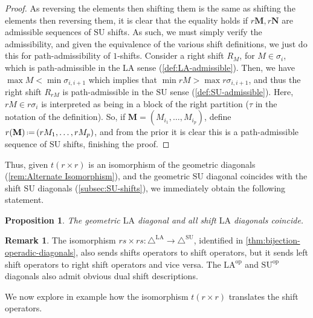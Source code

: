 \documentclass{amsart}
\newtheorem{proposition}[theorem]{Proposition}
\theoremstyle{definition}
\newtheorem{remark}[theorem]{Remark}
\newcommand{\eqdef}{\mbox{\,\raisebox{0.2ex}{\scriptsize\ensuremath{\mathrm:}}\ensuremath{=}\,}} %
\newcommand{\SU}{\mathrm{SU}}
\newcommand{\LA}{\mathrm{LA}}
\newcommand{\SUD}{\triangle^{\mathrm{SU}}}
\newcommand{\LAD}{\triangle^{\mathrm{LA}}}
\newcommand{\op}{\mathrm{op}}
\begin{document}
\begin{proof}
As reversing the elements then shifting them is the same as shifting the elements then reversing them,
it is clear that the equality holds if $r\mathbf{M},r\mathbf{N}$ are admissible sequences of $\SU$ shifts.
As such, we must simply verify the admissibility, and given the equivalence of the various shift definitions, we just do this for path-admissibility of $1$-shifts.
Consider a right shift $R_{M}$, for $M \in \sigma_i$, which is path-admissible in the $\LA$ sense (\cref{def:LA-admissible}). 
Then, we have $\max M < \min \sigma_{i,i+1}$ which implies that $\min r M > \max r \sigma_{i,i+1}$, and thus the right shift $R_{rM}$ is path-admissible in the $\SU$ sense (\cref{def:SU-admissible}).
Here, $rM \in r\sigma_i$ is interpreted as being in a block of the right partition ($\tau$ in the notation of the definition).
So, if $\mathbf{M} = (M_{i_1},\dots,M_{i_p})$, define $r(\mathbf{M}) \eqdef (rM_{1},\dots,rM_{p})$, and from the prior it is clear this is a path-admissible sequence of $\SU$ shifts, finishing the proof.
\end{proof}
Thus, given $t(r\times r)$ is an isomorphism of the geometric diagonals (\cref{rem:Alternate Isomorphism}), and the geometric $\SU$ diagonal coincides with the shift $\SU$ diagonals (\cref{subsec:SU-shifts}), we immediately obtain the following statement.
\begin{proposition}
The geometric $\LA$ diagonal and all shift $\LA$ diagonals coincide.
\end{proposition}

\begin{remark}
The isomorphism $rs\times rs:\LAD \to \SUD$, identified in \cref{thm:bijection-operadic-diagonals}, also sends shifts operators to shift operators, but it sends left shift operators to right shift operators and vice versa.
The $\LA^{\op}$ and $\SU^{\op}$ diagonals also admit obvious dual shift descriptions.
\end{remark}

We now explore in example how the isomorphism $t(r\times r)$ translates the shift operators.
\end{document}
